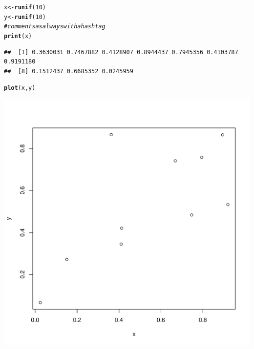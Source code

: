 \documentclass{article}\usepackage[]{graphicx}\usepackage[]{color}
\makeatletter
\def\maxwidth{ %
  \ifdim\Gin@nat@width>\linewidth
    \linewidth
  \else
    \Gin@nat@width
  \fi
}
\newcommand{\hlnum}[1]{\textcolor[rgb]{0.686,0.059,0.569}{#1}}%
\newcommand{\hlcom}[1]{\textcolor[rgb]{0.678,0.584,0.686}{\textit{#1}}}%
\newcommand{\hlstd}[1]{\textcolor[rgb]{0.345,0.345,0.345}{#1}}%
\newcommand{\hlkwb}[1]{\textcolor[rgb]{0.69,0.353,0.396}{#1}}%
\newcommand{\hlkwd}[1]{\textcolor[rgb]{0.737,0.353,0.396}{\textbf{#1}}}%
\newenvironment{kframe}{%
 \def\at@end@of@kframe{}%
 \ifinner\ifhmode%
  \def\at@end@of@kframe{\end{minipage}}%
  \begin{minipage}{\columnwidth}%
 \fi\fi%
 \def\FrameCommand##1{\hskip\@totalleftmargin \hskip-\fboxsep
 \colorbox{shadecolor}{##1}\hskip-\fboxsep
     \hskip-\linewidth \hskip-\@totalleftmargin \hskip\columnwidth}%
 \MakeFramed {\advance\hsize-\width
   \@totalleftmargin\z@ \linewidth\hsize
   \@setminipage}}%
 {\par\unskip\endMakeFramed%
 \at@end@of@kframe}
\newenvironment{knitrout}{}{} %
\makeatother
\begin{document}
\begin{knitrout}
\color{fgcolor}\begin{kframe}
\begin{alltt}
\hlstd{x} \hlkwb{<-} \hlkwd{runif}\hlstd{(}\hlnum{10}\hlstd{)}
\hlstd{y} \hlkwb{<-} \hlkwd{runif}\hlstd{(}\hlnum{10}\hlstd{)}
\hlcom{#comments as always with a hashtag}
\hlkwd{print}\hlstd{(x)}
\end{alltt}
\begin{verbatim}
##  [1] 0.3630031 0.7467882 0.4128907 0.8944437 0.7945356 0.4103787 0.9191180
##  [8] 0.1512437 0.6685352 0.0245959
\end{verbatim}
\begin{alltt}
\hlkwd{plot}\hlstd{(x,y)}
\end{alltt}
\end{kframe}
\includegraphics[width=\maxwidth]{figure/unnamed-chunk-1-1} 

\end{knitrout}
\end{document}
